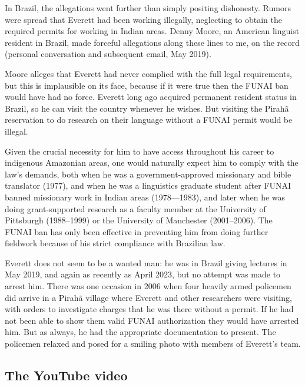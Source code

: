 \documentclass[output=paper,colorlinks,citecolor=brown
]{langscibook}
\begin{document}
In Brazil, the allegations went further than simply positing
dishonesty. Rumors were spread that Everett had been working
illegally, neglecting to obtain the required permits for working in
Indian areas. Denny Moore, an American linguist resident in Brazil,
made forceful allegations along these lines to me, on the record
(personal conversation and subsequent email, May 2019).

Moore alleges that Everett had never complied with the full legal
requirements, but this is implausible on its face, because if it were
true then the FUNAI ban would have had no force. Everett long ago
acquired permanent resident status in Brazil, so he can visit the
country whenever he wishes. But visiting the Pirah{\~a} reservation
to do research on their language without a FUNAI permit would be
illegal.

Given the crucial necessity for him to have access throughout his
career to indigenous Amazonian areas, one would naturally expect him
to comply with the law's demands, both when he was a government-approved
missionary and bible translator (1977), and when he was a linguistics
graduate student after FUNAI banned missionary work in Indian areas
(1978—1983), and later when he was doing grant-supported research as
a faculty member at the University of Pittsburgh (1988--1999) or the
University of Manchester (2001--2006). The FUNAI ban has only been
effective in preventing him from doing further fieldwork because of
his strict compliance with Brazilian law.

Everett does not seem to be a wanted man: he was in Brazil giving
lectures in May 2019, and again as recently as April 2023, but no
attempt was made to arrest him. There was one occasion in 2006 when
four heavily armed policemen did arrive in a Pirah{\~a} village
where Everett and other researchers were visiting, with orders to
investigate charges that he was there without a permit. If he had
not been able to show them valid FUNAI authorization they would
have arrested him. But as always, he had the appropriate documentation
to present. The policemen relaxed and posed for a smiling photo with
members of Everett's team.

\subsection{The YouTube video}
\end{document}
